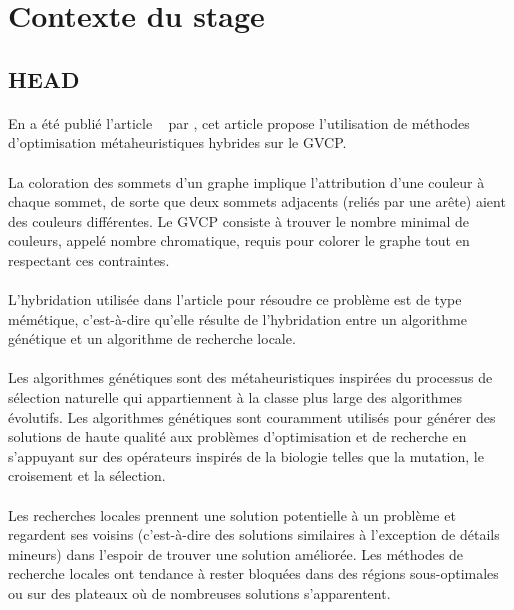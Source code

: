 \documentclass[a4paper,11pt,twoside,french,report]{../common/simplem}
\begin{document}
		\section{Contexte du stage}\label{sec:sujet_stage}
			\subsection{\acrshort{HEAD}}
				\paragraph*{}
					En \citeyear{Moalic2018} a été publié l'article ~\cite{Moalic2018} par \citeauthor{Moalic2018}, cet article propose l'utilisation de méthodes d'optimisation métaheuristiques hybrides sur le \gls{GVCP}.
				\paragraph*{}
					La coloration des sommets d'un graphe implique l'attribution d'une couleur à chaque sommet, de sorte que deux sommets adjacents (reliés par une arête) aient des couleurs différentes. Le \gls{GVCP} consiste à trouver le nombre minimal de couleurs, appelé nombre chromatique, requis pour colorer le graphe tout en respectant ces contraintes.
				\paragraph*{}
					L'hybridation utilisée dans l'article pour résoudre ce problème est de type mémétique, c'est-à-dire qu'elle résulte de l'hybridation entre un algorithme génétique et un algorithme de recherche locale.
				\paragraph*{}
					Les algorithmes génétiques sont des métaheuristiques inspirées du processus de sélection naturelle qui appartiennent à la classe plus large des algorithmes évolutifs. Les algorithmes génétiques sont couramment utilisés pour générer des solutions de haute qualité aux problèmes d'optimisation et de recherche en s'appuyant sur des opérateurs inspirés de la biologie telles que la mutation, le croisement et la sélection.
				\paragraph*{}
					Les recherches locales prennent une solution potentielle à un problème et regardent ses voisins (c'est-à-dire des solutions similaires à l'exception de détails mineurs) dans l'espoir de trouver une solution améliorée. Les méthodes de recherche locales ont tendance à rester bloquées dans des régions sous-optimales ou sur des plateaux où de nombreuses solutions s’apparentent.
\end{document}
